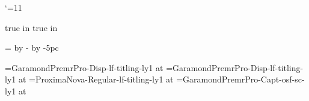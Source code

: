 \catcode`\@=11
%
%

\newdimen\textblock@top
\newdimen\textblock@odd@left
\newdimen\textblock@even@left

\def\settextblockposition#1#2{%
  \textblock@odd@left=#1
  \textblock@even@left=\pdfpagewidth
    \advance\textblock@even@left by -\hsize
    \advance\textblock@even@left by -#1
  \textblock@top=#2
}

\pdfhorigin=0pt
\pdfvorigin=0pt
 true in
 true in
\hsize=22pc
\vsize=39pc

\settextblockposition{5pc}{4.5pc}

%
%

\newif\if@cleared@page
\newif\if@display@page

\def\facingpages{%
  \if@cleared@page\headline={\line{}}\footline={\line{}}\fi%
  \if@display@page\headline={\line{}}\footline={\displaypagefootline}\fi%
  \global\@cleared@pagefalse%
  \global\@display@pagefalse%
  \dimen0=\ifodd\pageno\textblock@odd@left\else\textblock@even@left\fi%
  \shipout\vbox{\moveright\dimen0\vbox{\vskip\textblock@top\makeheadline\pagebody\makefootline}}%
  \advancepageno%
  \ifnum\outputpenalty>-20000 \else\dosupereject\fi%
}
\output{\facingpages}

%
%

\def\usefont#1{#1\baselineskip=\fontdimen6#1}


\newdimen\booktitlesize \booktitlesize=36pt
\newdimen\aheadsize \aheadsize=24pt
\newdimen\bheadsize \bheadsize=18pt
\newdimen\textsize \textsize=11pt
\newdimen\smalltextsize \smalltextsize=10pt
\newdimen\runningheadersize \runningheadersize=8pt

\font\booktitlefont=GaramondPremrPro-Disp-lf-titling-ly1 at \booktitlesize
\font\authornamefont=GaramondPremrPro-Disp-lf-titling-ly1 at \aheadsize
\font\logofont=ProximaNova-Regular-lf-titling-ly1 at \bheadsize
\font\runningheaderfont=GaramondPremrPro-Capt-osf-sc-ly1 at \runningheadersize

